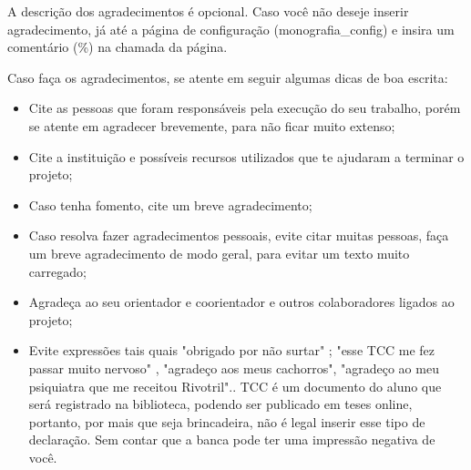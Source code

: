 \begin{agradecimentos}
	A descrição dos agradecimentos é opcional.
	Caso você não deseje inserir agradecimento, já até a página de configuração (monografia\_config) e insira um comentário (\%) na chamada da página.
	
	Caso faça os agradecimentos, se atente em seguir algumas dicas de boa escrita:
	
	\begin{itemize}
	    \item Cite as pessoas que foram responsáveis pela execução do seu trabalho, porém se atente em agradecer brevemente, para não ficar muito extenso;
	    \item Cite a instituição e possíveis recursos utilizados que te ajudaram a terminar o projeto;
	    \item Caso tenha fomento, cite um breve agradecimento;
	    \item Caso resolva fazer agradecimentos pessoais, evite citar muitas pessoas, faça um breve agradecimento de modo geral, para evitar um texto muito carregado;
	    \item Agradeça ao seu orientador e coorientador e outros colaboradores ligados ao projeto;
	    \item Evite expressões tais quais "obrigado por não surtar" ;  "esse TCC me fez passar muito nervoso" , "agradeço aos meus cachorros", "agradeço ao meu psiquiatra que me receitou Rivotril".. TCC é um documento do aluno que será registrado na biblioteca, podendo ser publicado em teses online, portanto, por mais que seja brincadeira, não é legal inserir esse tipo de declaração. Sem contar que a banca pode ter uma impressão negativa de você.
	\end{itemize}
\end{agradecimentos}